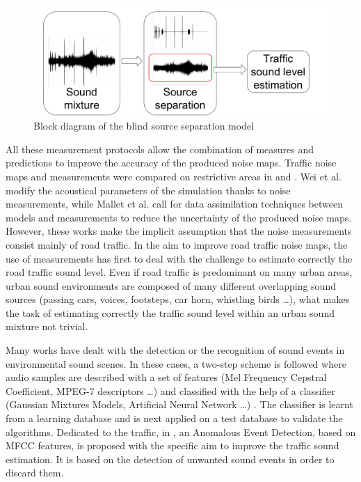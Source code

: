 \documentclass[review,5p,twocolumn,sort&compress,times]{elsarticle}
\begin{document}
\begin{figure}[t]
\centering
\includegraphics[width=.9\linewidth]{figures/bloc_diagram_source_separation.pdf}
\caption{Block diagram of the blind source separation model}
\label{fig:source_separation}
\end{figure}

All these measurement protocols allow the combination of measures and predictions to improve the accuracy of the produced noise maps. Traffic noise maps and measurements were compared on restrictive areas in \cite{lefebvre2017traffic} and \cite{mioduszewski2011noise}. Wei et al. \cite{wei_dynamic_2016} modify the acoustical parameters of the simulation thanks to noise measurements, while  Mallet et al. \cite{ventura2017estimation} call for data assimilation techniques between models and measurements to reduce the uncertainty of the produced noise maps. However, these works make the implicit assumption that the noise measurements consist mainly of road traffic. In the aim to improve road traffic noise maps, the use of measurements has first to deal with the challenge to estimate correctly the road traffic sound level.
Even if road traffic is predominant on many urban areas, urban sound environments are composed of many different overlapping sound sources (passing cars, voices, footsteps, car horn, whistling birds \dots), what makes the task of estimating correctly the traffic sound level within an urban sound mixture not trivial.

Many works have dealt with the detection \cite{luitel2016sound} or the recognition \cite{defreville_automatic_2006} of sound events in environmental sound scenes. In these cases, a two-step scheme is followed where audio samples are described with a set of features (Mel Frequency Cepstral Coefficient, MPEG-7 descriptors \dots) and classified with the help of a classifier (Gaussian Mixtures Models, Artificial Neural Network \dots) \cite{chu2008environmental, cowling_comparison_2003}. The classifier is learnt from a learning database and is next applied on a test database to validate the algorithms.
Dedicated to the traffic, in \cite{socoro_anomalous_2017}, an Anomalous Event Detection, based on MFCC features, is proposed with the specific aim to improve the traffic sound estimation. It is based on the detection of unwanted sound events in order to discard them.
\end{document}
